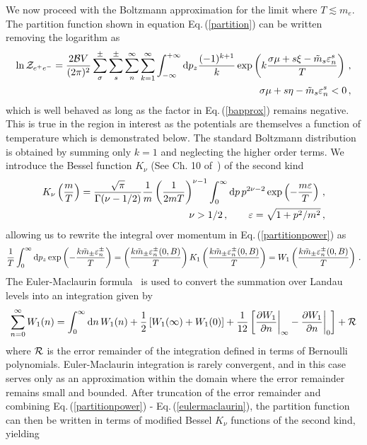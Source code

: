 \documentclass[a4paper]{article}
\newcommand{\req}[1]{Eq.\,(\ref{#1})}
\newcommand*{\xblue}{\color{black}}
\begin{document}
We now proceed with the Boltzmann approximation for the limit where $T\lesssim m_e$. {\xblue The partition function shown in equation \req{partition} can be written removing the logarithm as
\begin{align}
    \label{partitionpower}
    \ln{{\cal Z}_{e^{+}e^{-}}}=\frac{2{\cal B}V}{(2\pi)^{2}}\sum_{\sigma}^{\pm}\sum_{s}^{\pm}\sum_{n}^{\infty}\sum_{k=1}^{\infty}\int_{-\infty}^{+\infty}{\rm d}p_{z}\frac{(-1)^{k+1}}{k}\exp\left({k\frac{\sigma\mu+s\xi-{\tilde m}_{s}\varepsilon^{s}_{n}}{T}}\right)\,,\\
    \label{bapprox}
     \sigma\mu+s\eta-{\tilde m}_{s}\varepsilon_{n}^{s}<0\,,
\end{align}
which is well behaved as long as the factor in \req{bapprox} remains negative. This is true in the region in interest as the potentials are themselves a function of temperature which is demonstrated below. The standard Boltzmann distribution is obtained by summing only $k=1$ and neglecting the higher order terms. We introduce the Bessel function $K_{\nu}$ (See Ch. 10 of~\cite{letessier2002hadrons}) of the second kind
\begin{align}
    \label{besselk}
    K_{\nu}\left(\frac{m}{T}\right)=\frac{\sqrt{\pi}}{\Gamma(\nu-1/2)}\frac{1}{m}\left(\frac{1}{2mT}\right)^{\nu-1}\int_{0}^{\infty}{\rm d}p\,p^{2\nu-2}\exp\left({-\frac{m\varepsilon}{T}}\right)\,,\\
    \nu>1/2\,,\qquad\varepsilon=\sqrt{1+p^{2}/m^{2}}\,,
\end{align}
allowing us to rewrite the integral over momentum in \req{partitionpower} as
\begin{align}
    \label{besselkint}
    \frac{1}{T}\int_{0}^{\infty}{\rm d}p_{z}\exp\left({-\frac{k{\tilde m}_{\pm}\varepsilon_{n}^{\pm}}{T}}\right)=\left(\frac{k{\tilde m}_{\pm}\varepsilon_{n}^{\pm}(0,B)}{T}\right)K_{1}\left(\frac{k{\tilde m}_{\pm}\varepsilon_{n}^{\pm}(0,B)}{T}\right)=W_{1}\left(\frac{k{\tilde m}_{\pm}\varepsilon_{n}^{\pm}(0,B)}{T}\right)\,.
\end{align}
}
The Euler-Maclaurin formula~\cite{abramowitz1988handbook} is used to convert the summation over Landau levels into an integration {\xblue given by
\begin{align}
    \label{eulermaclaurin}
    \sum_{n=0}^{\infty}W_{1}(n)=\int_{0}^{\infty}{\rm d}n\,W_{1}(n)+\frac{1}{2}\left[W_{1}(\infty)+W_{1}(0)\right]+\frac{1}{12}\left[\frac{\partial W_{1}}{\partial n}\bigg\vert_{\infty}-\frac{\partial W_{1}}{\partial n}\bigg\vert_{0}\right]+{\cal R}
\end{align}
where ${\cal R}$ is the error remainder of the integration defined in terms of Bernoulli polynomials. Euler-Maclaurin integration is rarely convergent, and in this case serves only as an approximation within the domain where the error remainder remains small and bounded.} After truncation of the error remainder and combining \req{partitionpower} - \req{eulermaclaurin}, the partition function can then be written in terms of modified Bessel $K_{\nu}$ functions of the second kind, yielding
\end{document}
